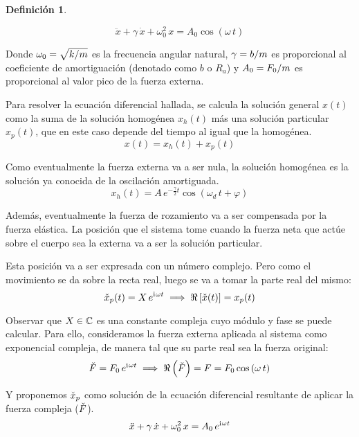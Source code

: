 \documentclass[a5paper,12pt,twoside]{book}
\newtheorem{defn}{{Definición}}[chapter]
\begin{document}
\begin{mdframed}[style=MyFrame1]
    \begin{defn}
    \end{defn}
    \begin{equation*}
        \ddot{x} + \gamma \, \dot{x} + \omega_0^2 \, x  = A_0 \cos \left( \omega \, t \right)
    \end{equation*}
\end{mdframed}

Donde $\omega_0 = \sqrt{k/m}$ es la frecuencia angular natural, $\gamma = b/m$ es proporcional al coeficiente de amortiguación (denotado como $b$ o $R_a$) y $A_0=F_0/m$ es proporcional al valor pico de la fuerza externa.

Para resolver la ecuación diferencial hallada, se calcula la solución general $x(t)$ como la suma de la solución homogénea $x_h(t)$ más una solución particular $x_p(t)$, que en este caso depende del tiempo al igual que la homogénea.
\[
    x(t) = x_h(t) + x_p(t)
\]

Como eventualmente la fuerza externa va a ser nula, la solución homogénea es la solución ya conocida de la oscilación amortiguada.
\[
    x_h(t) = A \, e^{-\tfrac{\gamma}{2}t} \cos(\omega_d \, t + \varphi)
\]

Además, eventualmente la fuerza de rozamiento va a ser compensada por la fuerza elástica. La posición que el sistema tome cuando la fuerza neta que actúe sobre el cuerpo sea la externa va a ser la solución particular.

Esta posición va a ser expresada con un número complejo. Pero como el movimiento se da sobre la recta real, luego se va a tomar la parte real del mismo:
\[
    \check{x}_p(t) = X \, e^{\mathrm{i}\mkern1mu \omega t} \implies \Re \left[ \check{x} (t) \right] = x_p(t)
\]

Observar que $X \in \mathbb{C}$ es una constante compleja cuyo módulo y fase se puede calcular. Para ello, consideramos la fuerza externa aplicada al sistema como exponencial compleja, de manera tal que su parte real sea la fuerza original:
\[
    \check{F} = F_0 \, e^{\mathrm{i}\mkern1mu \omega t} \implies \Re \left( \check{F} \right) = F = F_0 \cos \left( \omega \, t \right)
\]

Y proponemos $\check{x}_p$ como solución de la ecuación diferencial resultante de aplicar la fuerza compleja ($\check{F}$).
\[
    \ddot{x} + \gamma \, \dot{x} + \omega_0^2 \, x  = A_0 \, e^{\mathrm{i}\mkern1mu \omega t}
\]
\end{document}
